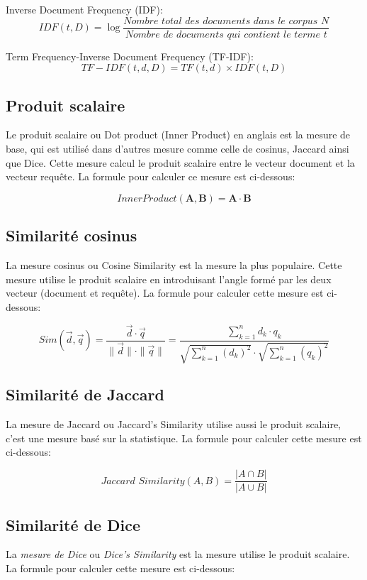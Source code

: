 Inverse Document Frequency (IDF):
\[
    IDF(t, D) = \log\frac{\textit{Nombre total des documents dans le corpus } N}{\textit{Nombre de documents qui contient le terme } t}
\]

Term Frequency-Inverse Document Frequency (TF-IDF):
\[
    TF-IDF(t, d, D) = \textit{TF}(t, d) \times \textit{IDF}(t, D)
\]

\subsection{Produit scalaire}
Le produit scalaire ou Dot product (Inner Product) en anglais est la mesure de base, qui est utilisé dans d'autres mesure comme celle de cosinus, Jaccard ainsi que Dice. Cette mesure calcul le produit scalaire entre le vecteur document et la vecteur requête. La formule pour calculer ce mesure est ci-dessous:

\[
    Inner Product(\mathbf{A}, \mathbf{B}) = \mathbf{A} \cdot \mathbf{B}
\]

\subsection{Similarité cosinus}
La mesure cosinus ou Cosine Similarity est la mesure la plus populaire. Cette mesure utilise le produit scalaire en introduisant l'angle formé par les deux vecteur (document et requête). La formule pour calculer cette mesure est ci-dessous:

\[
    Sim(\vec{d}, \vec{q}) = \frac{\vec{d} \cdot \vec{q}}{\|\vec{d}\| \cdot \|\vec{q}\|} = \frac{\sum_{k=1}^{n} d_{k} \cdot q_{k}}{\sqrt{\sum_{k=1}^{n} (d_{k})^2} \cdot \sqrt{\sum_{k=1}^{n} (q_{k})^2}}
\]

\subsection{Similarité de Jaccard}
La mesure de Jaccard ou Jaccard's Similarity utilise aussi le produit scalaire, c'est une mesure basé sur la statistique. La formule pour calculer cette mesure est ci-dessous:

\[
    \textit{Jaccard Similarity}(A, B) = \frac{|A \cap B|}{|A \cup B|}
\]

\subsection{Similarité de Dice}
La \emph{mesure de Dice} ou \emph{Dice's Similarity} est la mesure utilise le produit scalaire. La formule pour calculer cette mesure est ci-dessous:

